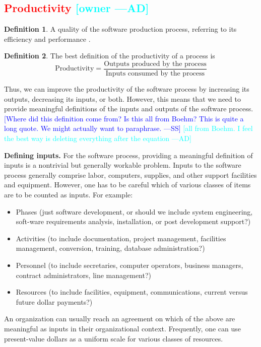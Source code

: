 \documentclass[letterpaper,cleveref]{lipics-v2019}
\newcommand{\authornote}[3]{\textcolor{#1}{[#3 ---#2]}}
\newcommand{\authornote}[3]{}
\newcommand{\wss}[1]{\authornote{blue}{SS}{#1}} %
\newcommand{\ad}[1]{\authornote{cyan}{AD}{#1}} %
\newcommand{\notdone}[1]{\textcolor{red}{#1}}
\theoremstyle{definition}
\newtheorem{defn}{Definition}
\begin{document}
\subsection{\notdone{Productivity} \ad{owner}}

\begin{defn}
  A quality of the software production process, referring to its efficiency and
  performance \citep{ghezzi1991fundamentals}.
\end{defn}
\begin{defn}
  The best definition of the productivity of a process is
	\[\text{Productivity} = \dfrac{\text{Outputs produced by the
              process}}{\text{Inputs consumed by the process}}\]

Thus, we can improve the productivity of the software process by increasing its
outputs, decreasing its inputs, or both. However, this means that we need to
provide meaningful definitions of the inputs and outputs of the software
process. \wss{Where did this definition come from?  Is this all from Boehm?
  This is quite a long quote.  We might actually want to paraphrase.}
\ad{all from Boehm. I feel the best way is deleting everything after the 
equation}

\textbf{Defining inputs.} For the software process, providing a meaningful
definition of inputs is a nontrivial but generally workable problem. Inputs to
the software process generally comprise labor, computers, supplies, and other
support facilities and equipment. However, one has to be careful which of
various classes of items are to be counted as inputs. For example:
\begin{itemize}
\item Phases (just software development, or should we include system
engineering, soft-ware requirements analysis, installation, or post development
support?)
\item Activities (to include documentation, project management, facilities
management, conversion, training, database administration?)
\item Personnel (to include secretaries, computer operators, business managers,
contract administrators, line management?)
\item Resources (to include facilities, equipment, communications, current
versus future dollar payments?)
\end{itemize}
An organization can usually reach an agreement on which of the above are
meaningful as inputs in their organizational context. Frequently, one can use
present-value dollars as a uniform scale for various classes of resources.


\end{defn}
\end{document}
